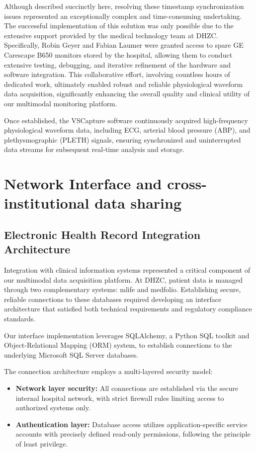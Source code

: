 Although described succinctly here, resolving these timestamp synchronization issues represented an exceptionally complex and time-consuming undertaking. The successful implementation of this solution was only possible due to the extensive support provided by the medical technology team at DHZC. Specifically, Robin Geyer and Fabian Laumer were granted access to spare GE Carescape B650 monitors stored by the hospital, allowing them to conduct extensive testing, debugging, and iterative refinement of the hardware and software integration. This collaborative effort, involving countless hours of dedicated work, ultimately enabled robust and reliable physiological waveform data acquisition, significantly enhancing the overall quality and clinical utility of our multimodal monitoring platform.

Once established, the VSCapture software continuously acquired high-frequency physiological waveform data, including ECG, arterial blood pressure (ABP), and plethysmographic (PLETH) signals, ensuring synchronized and uninterrupted data streams for subsequent real-time analysis and storage.


\section{Network Interface and cross-institutional data sharing}
\label{sec:electronic-health-records}

\subsection{Electronic Health Record Integration Architecture}

Integration with clinical information systems represented a critical component of our multimodal data acquisition platform. At DHZC, patient data is managed through two complementary systems: mlife and medfolio. Establishing secure, reliable connections to these databases required developing an interface architecture that satisfied both technical requirements and regulatory compliance standards.

Our interface implementation leverages SQLAlchemy, a Python SQL toolkit and Object-Relational Mapping (ORM) system, to establish connections to the underlying Microsoft SQL Server databases.

The connection architecture employs a multi-layered security model:

\begin{itemize}
  \item \textbf{Network layer security:} All connections are established via the secure internal hospital network, with strict firewall rules limiting access to authorized systems only.
  \item \textbf{Authentication layer:} Database access utilizes application-specific service accounts with precisely defined read-only permissions, following the principle of least privilege.
\end{itemize}

